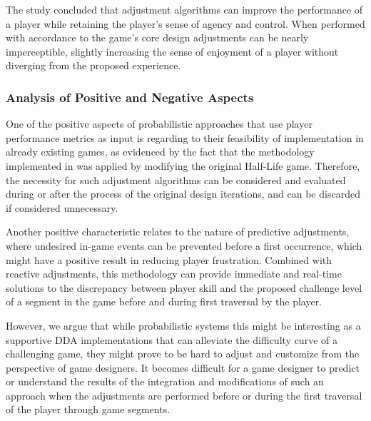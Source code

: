 The study concluded that adjustment algorithms can improve the performance of a player while retaining the player's sense of agency and control. When performed with accordance to the game's core design adjustments can be nearly imperceptible, slightly increasing the sense of enjoyment of a player without diverging from the proposed experience.

\subsubsection{Analysis of Positive and Negative Aspects}

One of the positive aspects of probabilistic approaches that use player performance metrics as input is regarding to their feasibility of implementation in already existing games, as evidenced by the fact that the methodology implemented in \cite{article_casefordynamicdifficulty} was applied by modifying the original Half-Life game. Therefore, the necessity for such adjustment algorithms can be considered and evaluated during or after the process of the original design iterations, and can be discarded if considered unnecessary.

Another positive characteristic relates to the nature of predictive adjustments, where undesired in-game events can be prevented before a first occurrence, which might have a positive result in reducing player frustration. Combined with reactive adjustments, this methodology can provide immediate and real-time solutions to the discrepancy between player skill and the proposed challenge level of a segment in the game before and during first traversal by the player.


However, we argue that while probabilistic systems this might be  interesting as a supportive DDA implementations that can alleviate the difficulty curve of a challenging game, they might prove to be hard to adjust and customize from the perspective of game designers. It becomes difficult for a game designer to predict or understand the results of the integration and modifications of such an approach when the adjustments are performed before or during the first traversal of the player through game segments.

